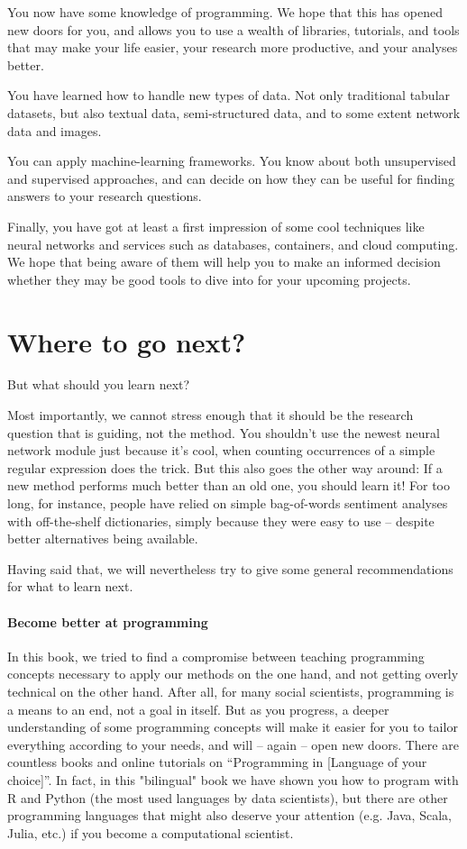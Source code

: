 You now have some knowledge of programming. We hope that this has opened new doors for you, and allows you to use a wealth of libraries, tutorials, and tools that may make your life easier, your research more productive, and your analyses better.

You have learned how to handle new types of data. Not only traditional tabular datasets, but also textual data, semi-structured data, and to some extent network data and images.

You can apply machine-learning frameworks. You know about both unsupervised and supervised approaches, and can decide on how they can be useful for finding answers to your research questions.

Finally, you have got at least a first impression of some cool techniques like neural networks and services such as databases, containers, and cloud computing. We hope that being aware of them will help you to make an informed decision whether they may be good tools to dive into for your upcoming projects.



\section{Where to go next?}
But what should you learn next?

Most importantly, we cannot stress enough that it should be the research question that is guiding, not the method. You shouldn't use the newest neural network module just because it's cool, when counting occurrences of a simple regular expression does the trick. But this also goes the other way around: If a new method performs much better than an old one, you should learn it! For too long, for instance, people have relied on simple bag-of-words sentiment analyses with off-the-shelf dictionaries, simply because they were easy to use -- despite better alternatives being available.

Having said that, we will nevertheless try to give some general recommendations for what to learn next.

\paragraph{Become better at programming} In this book, we tried to find a compromise between teaching programming concepts necessary to apply our methods on the one hand, and not getting overly technical on the other hand. After all, for many social scientists, programming is a means to an end, not a goal in itself. But as you progress, a deeper understanding of some programming concepts will make it easier for you to tailor everything according to your needs, and will -- again -- open new doors. There are countless books and online tutorials on ``Programming in [Language of your choice]''. In fact, in this "bilingual" book we have shown you how to program with R and Python (the most used languages by data scientists), but there are other programming languages that might also deserve your attention (e.g. Java, Scala, Julia, etc.) if you become a computational scientist. 


